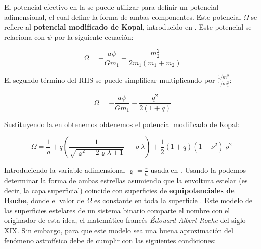El potencial efectivo en la  se puede utilizar para definir un potencial adimensional, el cual define la forma de ambas componentes. Este potencial $\Omega$ se refiere al \textbf{potencial modificado de Kopal}, introducido en . Este potencial se relaciona con $\psi$ por la siguiente ecuación:

\begin{eqfloat}[!ht]
	\centering
	\begin{equation}
		\Omega = -\frac{a \psi}{G m_1} - \frac{m_2^2}{2m_1(m_1 + m_2)}
	\end{equation}
\end{eqfloat}

El segundo término del RHS se puede simplificar multiplicando por $\frac{1/m_1^2}{1/m_1^2}$:

\begin{eqfloat}[!ht]
	\centering
	\begin{equation}
		\Omega = -\frac{a \psi}{G m_1} - \frac{q^2}{2(1 + q)}
	\end{equation}
	\blankcaption
	\label{ecuacionRochePotencialEfectivo}
\end{eqfloat}

Sustituyendo la  en
 obtenemos obtenemos el potencial modificado
de Kopal:

\begin{eqfloat}[!ht]
	\centering
	\begin{equation}
		\Omega = \frac{1}{\varrho} + q\left(\frac{1}{\sqrt{\varrho^2 - 2\varrho \lambda + 1}} - \varrho \lambda \right) + \frac{1}{2} (1 + q)(1 - \nu^2)\varrho^2
	\end{equation}
	\blankcaption
	\label{ecuacionRoche}
\end{eqfloat}

Introduciendo la variable adimensional $\varrho = \frac{r}{a}$ usada en
. Usando la
 podemos determinar la forma de ambas estrellas
asumiendo que la envoltura estelar (es decir, la capa superficial) coincide con
superficies de \textbf{equipotenciales de Roche}, donde el valor de $\Omega$ es
constante en toda la superficie
. Este modelo de las
superficies estelares de un sistema binario comparte el nombre con el originador
de esta idea, el matemático francés \textit{Édouard Albert Roche} del siglo XIX.
Sin embargo, para que este modelo sea una buena aproximación del fenómeno
astrofísico debe de cumplir con las siguientes condiciones:

